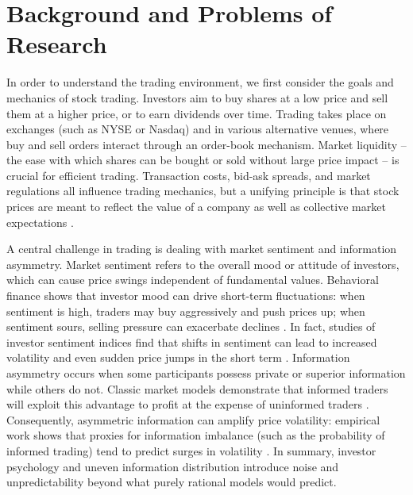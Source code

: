 \section{Background and Problems of Research}
\label{sec:background}
In order to understand the trading environment, we first consider the goals and mechanics of stock trading. Investors aim to buy shares at a low price and sell them at a higher price, or to earn dividends over time. Trading takes place on exchanges (such as NYSE or Nasdaq) and in various alternative venues, where buy and sell orders interact through an order-book mechanism. Market liquidity – the ease with which shares can be bought or sold without large price impact – is crucial for efficient trading. Transaction costs, bid-ask spreads, and market regulations all influence trading mechanics, but a unifying principle is that stock prices are meant to reflect the value of a company as well as collective market expectations \cite{Brealey2022}.

A central challenge in trading is dealing with market sentiment and information asymmetry. Market sentiment refers to the overall mood or attitude of investors, which can cause price swings independent of fundamental values. Behavioral finance shows that investor mood can drive short-term fluctuations: when sentiment is high, traders may buy aggressively and push prices up; when sentiment sours, selling pressure can exacerbate declines \cite{Kahneman2011}. In fact, studies of investor sentiment indices find that shifts in sentiment can lead to increased volatility and even sudden price jumps in the short term \cite{Ung2024}. Information asymmetry occurs when some participants possess private or superior information while others do not. Classic market models demonstrate that informed traders will exploit this advantage to profit at the expense of uninformed traders \cite{Kyle1985}. Consequently, asymmetric information can amplify price volatility: empirical work shows that proxies for information imbalance (such as the probability of informed trading) tend to predict surges in volatility \cite{Watanabe2008}. In summary, investor psychology and uneven information distribution introduce noise and unpredictability beyond what purely rational models would predict.

